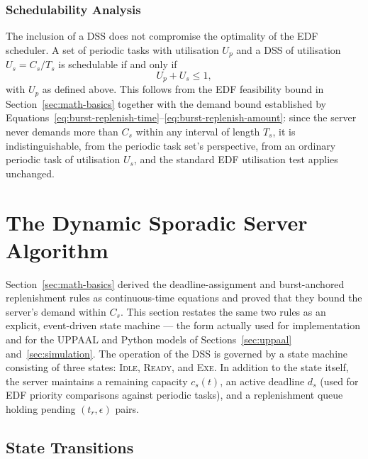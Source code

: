 \documentclass[conference]{IEEEtran}
\begin{document}
    \subsubsection{Schedulability Analysis}
    The inclusion of a DSS does not compromise the optimality of the EDF scheduler. A set of periodic tasks with utilisation $U_p$ and a DSS of utilisation $U_s = C_s/T_s$ is schedulable if and only if
    \begin{equation}
        U_p + U_s \leq 1,
    \end{equation}
    with $U_p$ as defined above. This follows from the EDF feasibility bound in Section~\ref{sec:math-basics} together with the demand bound established by Equations~\ref{eq:burst-replenish-time}–\ref{eq:burst-replenish-amount}: since the server never demands more than $C_s$ within any interval of length $T_s$, it is indistinguishable, from the periodic task set's perspective, from an ordinary periodic task of utilisation $U_s$, and the standard EDF utilisation test applies unchanged.

    \section{The Dynamic Sporadic Server Algorithm}
    \label{sec:algorithm}

    Section~\ref{sec:math-basics} derived the deadline-assignment and burst-anchored replenishment rules as continuous-time equations and proved that they bound the server's demand within $C_s$. This section restates the same two rules as an explicit, event-driven state machine — the form actually used for implementation and for the UPPAAL and Python models of Sections~\ref{sec:uppaal} and~\ref{sec:simulation}. The operation of the DSS is governed by a state machine consisting of three states: \textsc{Idle}, \textsc{Ready}, and \textsc{Exe}. In addition to the state itself, the server maintains a remaining capacity $c_s(t)$, an active deadline $d_s$ (used for EDF priority comparisons against periodic tasks), and a replenishment queue holding pending $(t_r, \epsilon)$ pairs.

    \subsection{State Transitions}
\end{document}
